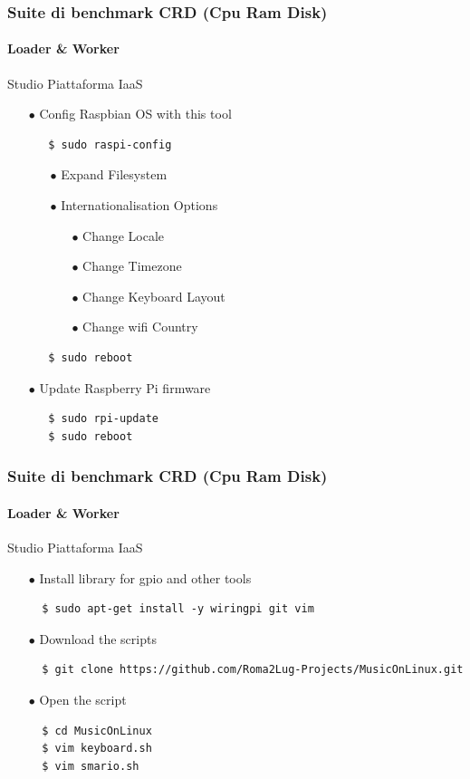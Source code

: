 \documentclass{beamer}
\begin{document}
\begin{frame}[fragile]
	\frametitle{\textbf{Suite di benchmark CRD (Cpu Ram Disk)}}
	\framesubtitle{\textbf{Loader \& Worker}}

	\begin{block}{Studio Piattaforma IaaS}
		\begin{itemize}
			\item[$\bullet$] Config Raspbian OS with this tool
			\begin{lstlisting}
   $ sudo raspi-config
			\end{lstlisting}
			\begin{itemize}
				\item[$\bullet$] Expand Filesystem
				\item[$\bullet$] Internationalisation Options
				\begin{itemize}
					\item[$\bullet$] Change Locale
					\item[$\bullet$] Change Timezone
					\item[$\bullet$] Change Keyboard Layout
					\item[$\bullet$] Change wifi Country
				\end{itemize}
			\end{itemize}
			\begin{lstlisting}
   $ sudo reboot
			\end{lstlisting}
			\item[$\bullet$] Update Raspberry Pi firmware
			\begin{lstlisting}
   $ sudo rpi-update
   $ sudo reboot
			\end{lstlisting}
		\end{itemize}
	\end{block}
\end{frame}


\begin{frame}[fragile]
	\frametitle{\textbf{Suite di benchmark CRD (Cpu Ram Disk)}}
	\framesubtitle{\textbf{Loader \& Worker}}

	\begin{block}{Studio Piattaforma IaaS}
		\begin{itemize}
			\item[$\bullet$] Install library for gpio and other tools
			\begin{lstlisting}
  $ sudo apt-get install -y wiringpi git vim
			\end{lstlisting}
			\item[$\bullet$] Download the scripts
			\begin{lstlisting}
  $ git clone https://github.com/Roma2Lug-Projects/MusicOnLinux.git
			\end{lstlisting}
			\item[$\bullet$] Open the script
			\begin{lstlisting}
  $ cd MusicOnLinux
  $ vim keyboard.sh
  $ vim smario.sh
			\end{lstlisting}
		\end{itemize}
	\end{block}
\end{frame}
\end{document}
